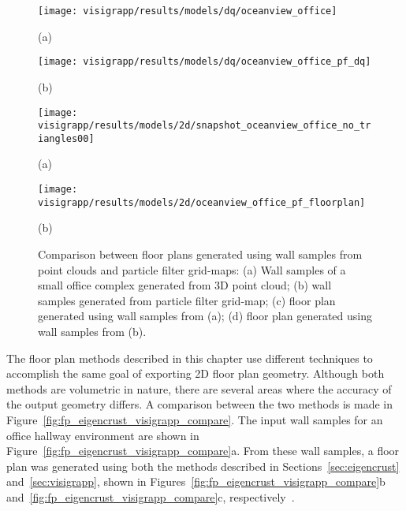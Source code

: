 \documentclass[12pt,onecolumn,oneside]{book}
\begin{document}
\begin{figure}

	\centering
	\begin{minipage}[b]{0.45\linewidth}
	\centerline{\texttt{[image: visigrapp/results/models/dq/oceanview\_office]}}
	\centerline{(a)}
	\end{minipage}
	\hfill
	\begin{minipage}[b]{0.45\linewidth}
	\centerline{\texttt{[image: visigrapp/results/models/dq/oceanview\_office\_pf\_dq]}}
	\centerline{(b)}
	\end{minipage}

	\centering
	\begin{minipage}[b]{0.45\linewidth}
	\centerline{\texttt{[image: visigrapp/results/models/2d/snapshot\_oceanview\_office\_no\_triangles00]}}
	\centerline{(a)}
	\end{minipage}
	\hfill
	\begin{minipage}[b]{0.45\linewidth}
	\centerline{\texttt{[image: visigrapp/results/models/2d/oceanview\_office\_pf\_floorplan]}}
	\centerline{(b)}
	\end{minipage}

	\caption[Comparison between floor plans generated from point clouds and grid-maps.]{Comparison between floor plans generated using wall samples from point clouds and particle filter grid-maps:  (a) Wall samples of a small office complex generated from 3D point cloud; (b) wall samples generated from particle filter grid-map; (c) floor plan generated using wall samples from (a); (d) floor plan generated using wall samples from (b).}
	\label{fig:pf_pc_compare}

\end{figure}

The floor plan methods described in this chapter use different techniques to accomplish the same goal of exporting 2D floor plan geometry.  Although both methods are volumetric in nature, there are several areas where the accuracy of the output geometry differs.  A comparison between the two methods is made in Figure~\ref{fig:fp_eigencrust_visigrapp_compare}.  The input wall samples for an office hallway environment are shown in Figure~\ref{fig:fp_eigencrust_visigrapp_compare}a.  From these wall samples, a floor plan was generated using both the methods described in Sections~\ref{sec:eigencrust} and~\ref{sec:visigrapp}, shown in Figures~\ref{fig:fp_eigencrust_visigrapp_compare}b and~\ref{fig:fp_eigencrust_visigrapp_compare}c, respectively~\cite{Turner12,Turner14}.
\end{document}
